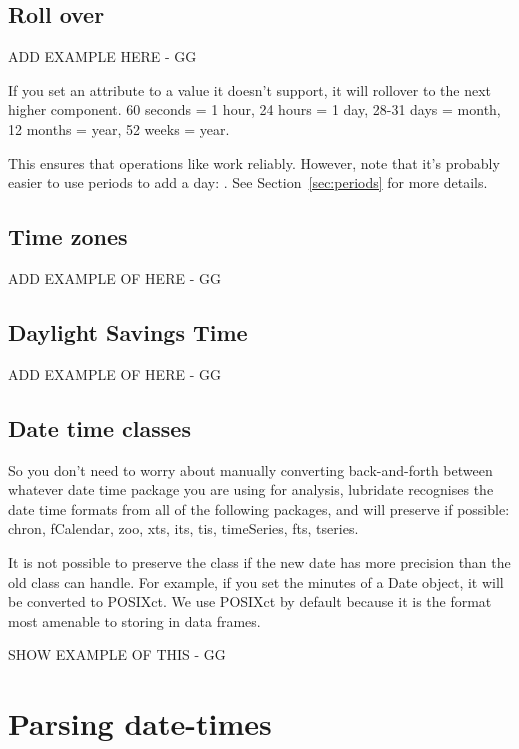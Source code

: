 \documentclass[article]{jss}
\begin{document}
\subsection{Roll over}

ADD EXAMPLE HERE - GG

If you set an attribute to a value it doesn't support, it will rollover to the next higher component.  60 seconds = 1 hour, 24 hours = 1 day, 28-31 days = month, 12 months = year, 52 weeks = year.  

This ensures that operations like  work reliably.  However, note that it's probably easier to use periods to add a day: .  See Section~\ref{sec:periods} for more details.

\subsection{Time zones}

ADD EXAMPLE OF HERE - GG

\subsection{Daylight Savings Time}
\label{sec:DST}

ADD EXAMPLE OF HERE - GG


\subsection{Date time classes}

So you don't need to worry about manually converting back-and-forth between whatever date time package you are using for analysis, lubridate recognises the date time formats from all of the following packages, and will preserve if possible: chron, fCalendar, zoo, xts, its, tis, timeSeries, fts, tseries.

It is not possible to preserve the class if the new date has more precision than the old class can handle.  For example, if you set the minutes of a Date object, it will be converted to POSIXct.  We use POSIXct by default because it is the format most amenable to storing in data frames.

SHOW EXAMPLE OF THIS - GG

\section{Parsing date-times}
\label{sec:parsing}
\end{document}
